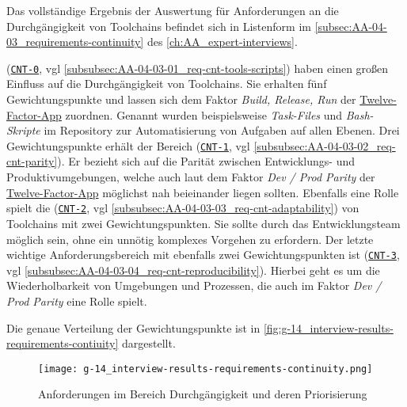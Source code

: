 Das vollständige Ergebnis der Auswertung für Anforderungen an die Durchgängigkeit von Toolchains befindet sich in Listenform im \autoref{subsec:AA-04-03_requirements-continuity} des \autoref{ch:AA_expert-interviews}.

\textbf{} (\hyperref[subsubsec:AA-04-03-01_req-cnt-tools-scripts]{\texttt{CNT-0}}, \acrshort{vgl} \autoref{subsubsec:AA-04-03-01_req-cnt-tools-scripts}) haben einen großen Einfluss auf die Durchgängigkeit von Toolchains. Sie erhalten fünf Gewichtungspunkte und lassen sich dem Faktor \textit{Build, Release, Run} der \hyperref[sec:03-05_concept-of-twelve-factor-app]{Twelve-Factor-App} zuordnen. Genannt wurden beispielsweise \textit{Task-Files} und \textit{Bash-Skripte} im Repository zur Automatisierung von Aufgaben auf allen Ebenen. Drei Gewichtungspunkte erhält der Bereich \textbf{} (\hyperref[subsubsec:AA-04-03-02_req-cnt-parity]{\texttt{CNT-1}}, \acrshort{vgl} \autoref{subsubsec:AA-04-03-02_req-cnt-parity}). Er bezieht sich auf die Parität zwischen Entwicklungs- und Produktivumgebungen, welche auch laut dem Faktor \textit{Dev / Prod Parity} der \hyperref[sec:03-05_concept-of-twelve-factor-app]{Twelve-Factor-App} möglichst nah beieinander liegen sollten. Ebenfalls eine Rolle spielt die \textbf{} (\hyperref[subsubsec:AA-04-03-03_req-cnt-adaptability]{\texttt{CNT-2}}, \acrshort{vgl} \autoref{subsubsec:AA-04-03-03_req-cnt-adaptability}) von Toolchains mit zwei Gewichtungspunkten. Sie sollte durch das Entwicklungsteam möglich sein, ohne ein unnötig komplexes Vorgehen zu erfordern. Der letzte wichtige Anforderungsbereich mit ebenfalls zwei Gewichtungspunkten ist \textbf{} (\hyperref[subsubsec:AA-04-03-04_req-cnt-reproducibility]{\texttt{CNT-3}}, \acrshort{vgl} \autoref{subsubsec:AA-04-03-04_req-cnt-reproducibility}). Hierbei geht es um die Wiederholbarkeit von Umgebungen und Prozessen, die auch im Faktor \textit{Dev / Prod Parity} eine Rolle spielt.

Die genaue Verteilung der Gewichtungspunkte ist in \autoref{fig:g-14_interview-results-requirements-contiuity} dargestellt.

\begin{figure}[h]
    \centering
    \texttt{[image: g-14\_interview-results-requirements-continuity.png]}
    \caption{Anforderungen im Bereich Durchgängigkeit und deren Priorisierung}
    \label{fig:g-14_interview-results-requirements-contiuity}
\end{figure}
